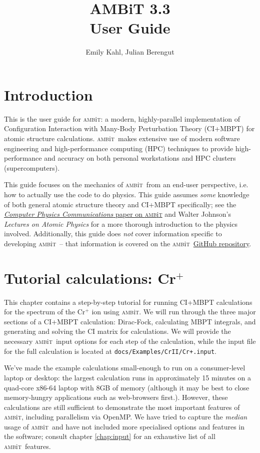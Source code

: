 \documentclass{report}
\newcommand{\ambit}{\textsc{amb}{\footnotesize i}\textsc{t}}
\begin{document}
\title{AMBiT 3.3\\User Guide}
\author{Emily Kahl, Julian Berengut}
\date{}
\maketitle

\tableofcontents

\chapter{Introduction}
This is the user guide for \ambit: a modern, highly-parallel implementation of Configuration Interaction
with Many-Body Perturbation Theory (CI+MBPT) for atomic structure calculations. \ambit\ makes extensive 
use of modern software engineering and high-performance computing (HPC) techniques to provide 
high-performance and accuracy on both personal workstations and HPC clusters (supercomputers).

This guide focuses on the mechanics of \ambit\ from an end-user perspective, i.e. how to actually use the
code to do physics. This guide assumes \emph{some} knowledge of both general atomic structure theory and
CI+MBPT specifically; see the \href{https://doi.org/10.1016/j.cpc.2018.12.014}{\textit{Computer Physics Communications} paper on 
\ambit} and Walter Johnson's \textit{Lectures on Atomic Physics} for a more thorough 
introduction to the physics involved. Additionally, this guide does \emph{not} cover information 
specific to developing \ambit\ -- that information is covered on the \ambit\  
\href{https://github.com/drjuls/AMBiT}{GitHub repository}.

\chapter{Tutorial calculations: Cr$^+$}

This chapter contains a step-by-step tutorial for running CI+MBPT calculations for the spectrum of the
Cr$^+$ ion using \ambit. We will run through the three major sections of a CI+MBPT calculation:
Dirac-Fock, calculating MBPT integrals, and generating and solving the CI matrix for calculations. We
will provide the necessary \ambit\  input options for each step of the calculation, while the input file
for the full calculation is located at \texttt{docs/Examples/CrII/Cr+.input}.

We've made the example calculations small-enough to run on a consumer-level laptop or desktop: the
largest calculation runs in approximately 15 minutes on a quad-core x86-64 laptop with 8GB of
memory (although it may be best to close memory-hungry applications such as web-browsers
first.). However, these calculations are still sufficient to demonstrate the most important features of 
\ambit, including parallelism via OpenMP. We have tried to capture the \textit{median} usage of \ambit\ 
and have not included more specialised options and features in the software; consult chapter
\ref{chap:input} for an exhaustive list of all \ambit\  features.
\end{document}
